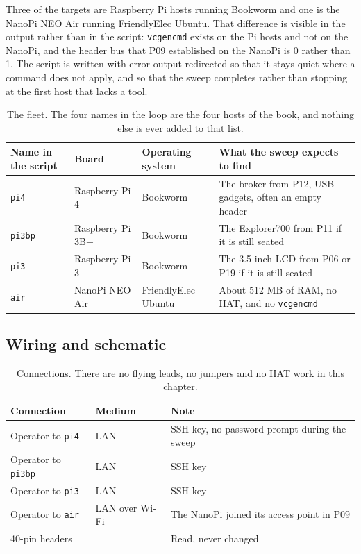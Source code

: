 Three of the targets are Raspberry Pi hosts running Bookworm and one is the NanoPi NEO Air running FriendlyElec Ubuntu. That difference is visible in the output rather than in the script: \texttt{vcgencmd} exists on the Pi hosts and not on the NanoPi, and the header bus that P09 established on the NanoPi is 0 rather than 1. The script is written with error output redirected so that it stays quiet where a command does not apply, and so that the sweep completes rather than stopping at the first host that lacks a tool.

\begin{table}[H]\centering\small
\begin{tabular}{p{24mm}p{34mm}p{34mm}p{58mm}}
\toprule
Name in the script & Board & Operating system & What the sweep expects to find \\
\midrule
\texttt{pi4} & Raspberry Pi 4 & Bookworm & The broker from P12, USB gadgets, often an empty header \\
\texttt{pi3bp} & Raspberry Pi 3B+ & Bookworm & The Explorer700 from P11 if it is still seated \\
\texttt{pi3} & Raspberry Pi 3 & Bookworm & The 3.5 inch LCD from P06 or P19 if it is still seated \\
\texttt{air} & NanoPi NEO Air & FriendlyElec Ubuntu & About 512 MB of RAM, no HAT, and no \texttt{vcgencmd} \\
\bottomrule
\end{tabular}
\caption{The fleet. The four names in the loop are the four hosts of the book, and nothing else is ever added to that list.}
\end{table}

\subsection*{Wiring and schematic}


\begin{table}[H]\centering\small
\begin{tabular}{p{34mm}p{34mm}p{82mm}}
\toprule
Connection & Medium & Note \\
\midrule
Operator to \texttt{pi4} & LAN & SSH key, no password prompt during the sweep \\
Operator to \texttt{pi3bp} & LAN & SSH key \\
Operator to \texttt{pi3} & LAN & SSH key \\
Operator to \texttt{air} & LAN over Wi-Fi & The NanoPi joined its access point in P09 \\
40-pin headers & & Read, never changed \\
\bottomrule
\end{tabular}
\caption{Connections. There are no flying leads, no jumpers and no HAT work in this chapter.}
\end{table}

